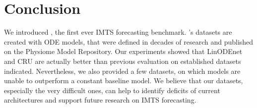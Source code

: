 \section{Conclusion}
We introduced \Bench, the first ever IMTS forecasting benchmark.
\Bench's datasets are created with ODE models, that were defined in decades of research and published on
the Physiome Model Repository. Our experiments showed that LinODEnet and CRU are actually
better than previous evaluation on established datasets indicated. Nevertheless,
we also provided a few datasets, on which models are unable to outperform a
constant baseline model. We believe that our datasets, especially the very difficult ones,
can help to identify deficits of current architectures and support future research on
IMTS forecasting.
